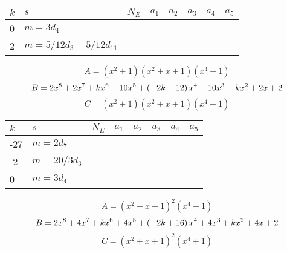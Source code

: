 \documentclass{amsart}
\begin{document}
\begin{longtable}{|l|l|l|lllll|}
\hline
$k$ & $s$ & $N_E$ & $a_1$ & $a_2$ & $a_3$ & $a_4$ & $a_5$\\
\hline
0&$m=3d_{4}$&&\multicolumn{5}{c|}{}\\
2&$m=5/12d_{3}+5/12d_{11}$&&\multicolumn{5}{c|}{}\\
\hline
\end{longtable}
$$A=(x^2
 + 1)(x^2
 + x
 + 1)(x^4
 + 1)$$
$$B=2\*x^8
 + 2\*x^7
 + k\*x^6
 - 10\*x^5
 + \left(-2\*k
 - 12\right) \*x^4
 - 10\*x^3
 + k\*x^2
 + 2\*x
 + 2$$
$$C=(x^2
 + 1)(x^2
 + x
 + 1)(x^4
 + 1)$$
\begin{longtable}{|l|l|l|lllll|}
\hline
$k$ & $s$ & $N_E$ & $a_1$ & $a_2$ & $a_3$ & $a_4$ & $a_5$\\
\hline
-27&$m=2d_{7}$&&\multicolumn{5}{c|}{}\\
-2&$m=20/3d_{3}$&&\multicolumn{5}{c|}{}\\
0&$m=3d_{4}$&&\multicolumn{5}{c|}{}\\
\hline
\end{longtable}
$$A=(x^2
 + x
 + 1)^{2}(x^4
 + 1)$$
$$B=2\*x^8
 + 4\*x^7
 + k\*x^6
 + 4\*x^5
 + \left(-2\*k
 + 16\right) \*x^4
 + 4\*x^3
 + k\*x^2
 + 4\*x
 + 2$$
$$C=(x^2
 + x
 + 1)^{2}(x^4
 + 1)$$
\end{document}
